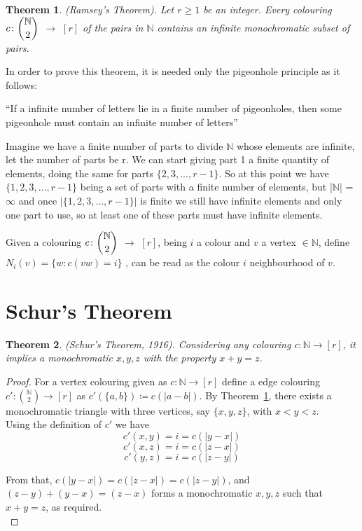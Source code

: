 \documentclass[12pt,twoside,a4paper]{book}
\numberwithin{equation}{section}
\newtheorem{theorem}             {Theorem}[section]
\theoremstyle{remark}
\begin{document}
\begin{theorem}\label{thm:RamseyTheorem} 
(Ramsey's Theorem). Let $r \geq 1$ be an integer. Every colouring $c\colon \dbinom{\mathbb{N}}{2}$ $\rightarrow$ $[r]$ of the pairs in $\mathbb{N}$ contains an infinite monochromatic subset of pairs.
\end{theorem}

In order to prove this theorem, it is needed only the pigeonhole principle as it follows:

``If a infinite number of letters lie in a finite number of pigeonholes, then some pigeonhole must contain an infinite number of letters''

Imagine we have a finite number of parts to divide $\mathbb{N}$ whose elements are infinite, let the number of parts be r. We can start giving part 1 a finite quantity of elements, doing the same for parts $\{2, 3,..., r-1\}$. So at this point we have $\{1,2,3,...,r-1\}$ being a set of parts with a finite number of elements, but |$\mathbb{N}$| = $\infty$ and once $|\{1, 2, 3,..., r-1\}|$ is finite we still have infinite elements and only one part to use, so at least one of these parts must have infinite elements.

Given a colouring $c\colon\dbinom{\mathbb{N}}{2}$ $\rightarrow$ $[r]$, being $i$ a colour and  $v$ a vertex $\in \mathbb{N}$, define $N_i(v) =\{ w: c(vw)=i\}$ , can be read as the colour $i$ neighbourhood of $v$.

\section{Schur's Theorem}

\begin{theorem}\label{thm:Schur'sTheorem}
(Schur's Theorem, 1916). Considering any colouring $c\colon \mathbb{N} \rightarrow [r]$, it implies a monochromatic $x,y,z$ with the property $x+y=z$.
\end{theorem}
\begin{proof}
  For a vertex colouring  given as $c\colon \mathbb{N} \rightarrow [r]$ define a edge colouring $c'\colon \binom{\mathbb{N}}{2} \rightarrow [r]$ as $c'(\{a,b\}) \coloneqq c(|a-b|)$. By Theorem~\ref{thm:RamseyTheorem}, there exists a monochromatic triangle with three vertices, say $\{x,y,z\}$, with $x<y<z$.\\
Using the definition of $c'$  we have
$$c'({x,y}) = i = c(|y-x|)$$
$$c'({x,z})=  i = c(|z-x|)$$
$$c'({y,z}) = i = c(|z-y|)$$

From that, $c(|y-x|) = c(|z-x|) = c(|z-y|)$, and $(z-y)+(y-x)=(z-x)$ forms a monochromatic $x,y,z$ such that $x+y=z$, as required.\\
\end{proof}
\end{document}
